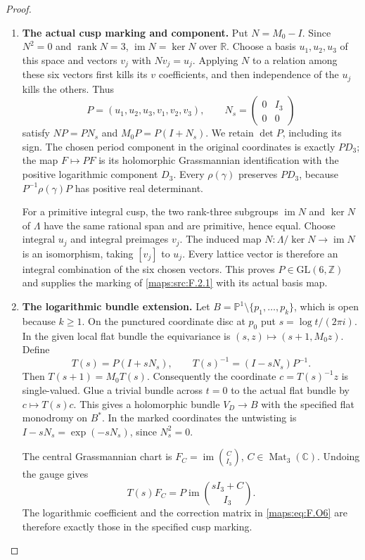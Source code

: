 \begin{proof}
\begin{enumerate}[label=\arabic*.]
\item \textbf{The actual cusp marking and component.}
Put $N=M_0-I$. Since $N^2=0$ and $\operatorname{rank}N=3$,
$\operatorname{im}N=\ker N$ over $\mathbb R$.
Choose a basis $u_1,u_2,u_3$ of this space and vectors $v_j$
with $Nv_j=u_j$. Applying $N$ to a relation among these six
vectors first kills its $v$ coefficients, and then independence
of the $u_j$ kills the others. Thus
\[
 P=(u_1,u_2,u_3,v_1,v_2,v_3),\qquad
 N_s=\begin{pmatrix}0&I_3\\0&0\end{pmatrix}
\]
satisfy $NP=PN_s$ and $M_0P=P(I+N_s)$.
We retain $\det P$, including its sign. The chosen period
component in the original coordinates is exactly $PD_3$;
the map $F\mapsto PF$ is its holomorphic Grassmannian
identification with the positive logarithmic component $D_3$.
Every $\rho(\gamma)$ preserves $PD_3$, because
$P^{-1}\rho(\gamma)P$ has positive real determinant.

For a primitive integral cusp, the two rank-three subgroups
$\operatorname{im}N$ and $\ker N$ of $\Lambda$ have the same
rational span and are primitive, hence equal. Choose integral
$u_j$ and integral preimages $v_j$. The induced map
$N:\Lambda/\ker N\longrightarrow\operatorname{im}N$ is an
isomorphism, taking $[v_j]$ to $u_j$. Every lattice vector is
therefore an integral combination of the six chosen vectors.
This proves $P\in\mathrm{GL}(6,\mathbb Z)$ and supplies the
marking of \ref{maps:src:F.2.1} with its actual basis map.

\item \textbf{The logarithmic bundle extension.}
Let $B=\mathbb P^1\setminus\{p_1,\ldots,p_k\}$, which is
open because $k\ge1$. On the punctured coordinate disc at
$p_0$ put $s=\log t/(2\pi i)$. In the given local flat
bundle the equivariance is $(s,z)\mapsto(s+1,M_0z)$.
Define
\[
 T(s)=P(I+sN_s),\qquad
 T(s)^{-1}=(I-sN_s)P^{-1}.
\]
Then $T(s+1)=M_0T(s)$. Consequently the coordinate
$c=T(s)^{-1}z$ is single-valued. Glue a trivial bundle across
$t=0$ to the actual flat bundle by $c\mapsto T(s)c$.
This gives a holomorphic bundle $V_D\to B$ with the specified
flat monodromy on $B^*$.
In the marked coordinates the untwisting is
$I-sN_s=\exp(-sN_s)$, since $N_s^2=0$.

The central Grassmannian chart is
$F_C=\operatorname{im}\binom C{I_3}$,
$C\in\operatorname{Mat}_3(\mathbb C)$. Undoing the gauge gives
\[
 T(s)F_C=P\operatorname{im}\binom{sI_3+C}{I_3}.
\]
The logarithmic coefficient and the correction matrix in
\eqref{maps:eq:F.O6} are therefore exactly those in the
specified cusp marking.


\end{enumerate}
\end{proof}
